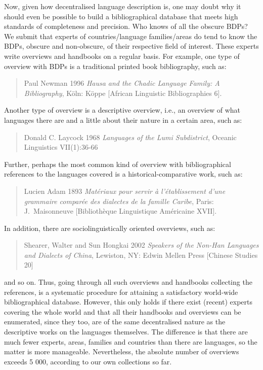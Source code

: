 \documentclass[english,11pt,twoside]{article}
\begin{document}
Now, given how decentralised language description is, one may doubt
why it should even be possible to build a bibliographical database
that meets high standards of completeness and precision. Who knows of
all the obscure BDPs? We submit that experts of countries/language
families/areas do tend to know the BDPs, obscure and non-obscure, of
their respective field of interest. These experts write overviews and
handbooks on a regular basis. For example, one type of overview with
BDPs is a traditional printed book bibliography, such as:
\begin{quote}
{\small
Paul Newman 1996 \emph{Hausa and the Chadic Language Family: A Bibliography},
K\"oln: K\"oppe [African Linguistic Bibliographies 6].}
\end{quote}
Another type of overview is a descriptive overview, i.e., an overview
of what languages there are and a little about their nature in a
certain area, such as:
\begin{quote}
{\small
Donald C. Laycock 1968 \emph{Languages of the Lumi Subdistrict}, Oceanic Linguistics VII(1):36-66}
\end{quote}
Further, perhaps the most common kind of overview with bibliographical references to the languages covered is a historical-comparative work, such as:
\begin{quote}
{\small
Lucien Adam 1893 \emph{Mat\'eriaux pour servir \`a l'\'etablissement d'une grammaire compar\'ee des dialectes de la famille Caribe},
Paris: J.~Maisonneuve [Biblioth\`eque Linguistique Am\'ericaine XVII].}
\end{quote}
In addition, there are sociolinguistically oriented overviews, such as:
\begin{quote}
{\small
Shearer, Walter and Sun Hongkai 2002 \emph{Speakers of the Non-Han Languages and Dialects of China}, Lewiston, NY: Edwin Mellen Press [Chinese Studies 20]}
\end{quote}
and so on. Thus, going through all such overviews and handbooks
collecting the references, is a systematic procedure for attaining a
satisfactory world-wide bibliographical database. However, this only
holds if there exist (recent) experts covering the whole world and
that all their handbooks and overviews can be enumerated, since they
too, are of the same decentralised nature as the descriptive works on
the languages themselves. The difference is that there are much fewer
experts, areas, families and countries than there are languages, so
the matter is more manageable. Nevertheless, the absolute number of
overviews exceeds 5 000, according to our own collections so far.
\end{document}
